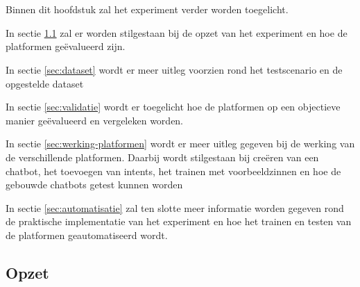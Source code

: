 
\chapter{}
\label{ch:methodologie}

Binnen dit hoofdstuk zal het experiment verder worden toegelicht.

In sectie \ref{sec:opzet} zal er worden stilgestaan bij de opzet van het experiment en hoe de platformen geëvalueerd zijn.

In sectie \ref{sec:dataset} wordt er meer uitleg voorzien rond het testscenario en de opgestelde dataset

In sectie \ref{sec:validatie} wordt er toegelicht hoe de platformen op een objectieve manier geëvalueerd en vergeleken worden.

In sectie \ref{sec:werking-platformen} wordt er meer uitleg gegeven bij de werking van de verschillende platformen. Daarbij wordt stilgestaan bij creëren van een chatbot, het toevoegen van intents, het trainen met voorbeeldzinnen en hoe de gebouwde chatbots getest kunnen worden

In sectie \ref{sec:automatisatie} zal ten slotte meer informatie worden gegeven rond de praktische implementatie van het experiment en hoe het trainen en testen van de platformen geautomatiseerd wordt.


\section{Opzet}
\label{sec:opzet}

